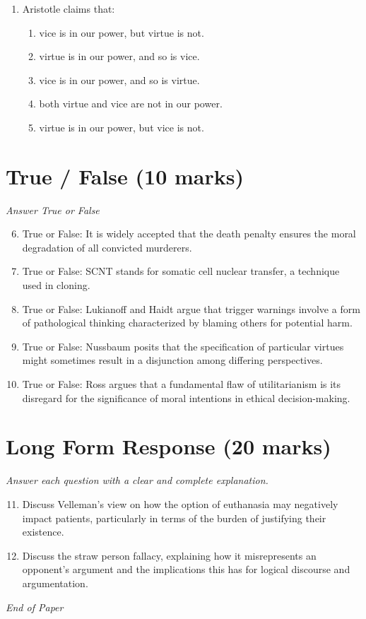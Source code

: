 \documentclass[12pt]{article}
\begin{document}
\begin{enumerate}[label=\arabic*.]
\begin{enumerate}[label=(\alph*)]
    \item Lutherans
    \item Methodists
    \item Greek Orthodox
    \item Quakers
\end{enumerate}
\item Aristotle claims that:
\begin{enumerate}[label=(\alph*)]
    \item vice is in our power, but virtue is not.
    \item virtue is in our power, and so is vice.
    \item vice is in our power, and so is virtue.
    \item both virtue and vice are not in our power.
    \item virtue is in our power, but vice is not.
\end{enumerate}
\end{enumerate}

\section*{True / False (10 marks)}
\textit{Answer True or False}
\begin{enumerate}[label=\arabic*.]
\setcounter{enumi}{5}
\item True or False: It is widely accepted that the death penalty ensures the moral degradation of all convicted murderers.
\item True or False: SCNT stands for somatic cell nuclear transfer, a technique used in cloning.
\item True or False: Lukianoff and Haidt argue that trigger warnings involve a form of pathological thinking characterized by blaming others for potential harm.
\item True or False: Nussbaum posits that the specification of particular virtues might sometimes result in a disjunction among differing perspectives.
\item True or False: Ross argues that a fundamental flaw of utilitarianism is its disregard for the significance of moral intentions in ethical decision-making.
\end{enumerate}

\section*{Long Form Response (20 marks)}
\textit{Answer each question with a clear and complete explanation.}
\begin{enumerate}[label=\arabic*.]
\setcounter{enumi}{10}
\item Discuss Velleman's view on how the option of euthanasia may negatively impact patients, particularly in terms of the burden of justifying their existence.
\item Discuss the straw person fallacy, explaining how it misrepresents an opponent's argument and the implications this has for logical discourse and argumentation.
\end{enumerate}

\vfill
\noindent\textit{End of Paper}
\end{document}

